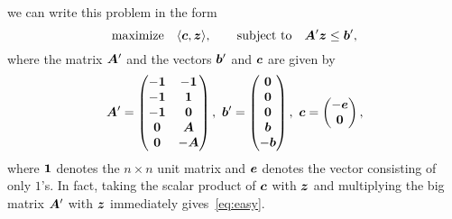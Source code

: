 \documentclass{article}
\begin{document}
we can write this problem in the form
\begin{equation*}
 \text{maximize}\quad \langle {\bm{c}}, {\bm{z}} \rangle, \quad \quad\text{subject to}\quad \bm{A}'\bm{z}\leq \bm{b}',
\end{equation*}
where the matrix $\bm{A}'$ and the vectors $\bm{b}'$ and $\bm{c}$ are given by
\begin{equation*}
 \mtx{A}' = \begin{pmatrix} 
            -\mtx{1} & -\mtx{1}\\
            -\mtx{1} & \mtx{1}\\
            -\mtx{1} & \zerovct\\
            \zerovct & \mtx{A}\\
            \zerovct & -\mtx{A}
           \end{pmatrix}, \ 
 \vct{b}' = \begin{pmatrix}
             \zerovct\\ \zerovct \\ \zerovct \\ \vct{b} \\ -\vct{b}
            \end{pmatrix}, \
 \vct{c} = \begin{pmatrix}
            -\vct{e}\\ \zerovct
           \end{pmatrix},
\end{equation*}
where $\bm{1}$ denotes the $n\times n$ unit matrix and $\bm{e}$ denotes the vector consisting of only $1$'s. In fact, taking the scalar product of $\bm{c}$ with $\bm{z}$ and multiplying the big matrix $\bm{A}'$ with $\bm{z}$ immediately gives~\eqref{eq:easy}.
\end{document}
